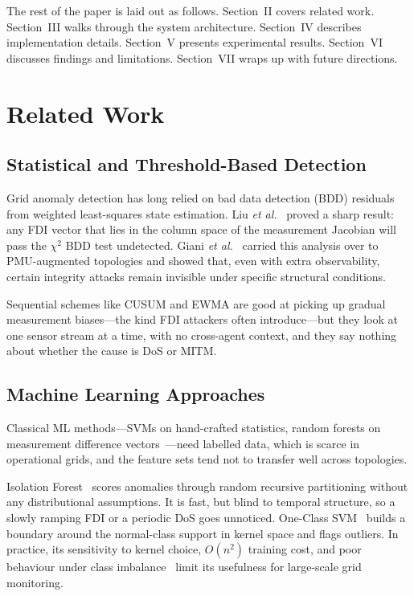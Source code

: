 \documentclass[conference]{IEEEtran}
\begin{document}
The rest of the paper is laid out as follows. Section~II covers related work. Section~III walks through the system architecture. Section~IV describes implementation details. Section~V presents experimental results. Section~VI discusses findings and limitations. Section~VII wraps up with future directions.

\section{Related Work}

\subsection{Statistical and Threshold-Based Detection}

Grid anomaly detection has long relied on bad data detection (BDD) residuals from weighted least-squares state estimation. Liu \textit{et al.}~\cite{b2} proved a sharp result: any FDI vector that lies in the column space of the measurement Jacobian will pass the $\chi^2$ BDD test undetected. Giani \textit{et al.}~\cite{b4} carried this analysis over to PMU-augmented topologies and showed that, even with extra observability, certain integrity attacks remain invisible under specific structural conditions.

Sequential schemes like CUSUM and EWMA are good at picking up gradual measurement biases---the kind FDI attackers often introduce---but they look at one sensor stream at a time, with no cross-agent context, and they say nothing about whether the cause is DoS or MITM.

\subsection{Machine Learning Approaches}

Classical ML methods---SVMs on hand-crafted statistics, random forests on measurement difference vectors~\cite{b6}---need labelled data, which is scarce in operational grids, and the feature sets tend not to transfer well across topologies.

Isolation Forest~\cite{b8} scores anomalies through random recursive partitioning without any distributional assumptions. It is fast, but blind to temporal structure, so a slowly ramping FDI or a periodic DoS goes unnoticed. One-Class SVM~\cite{b9} builds a boundary around the normal-class support in kernel space and flags outliers. In practice, its sensitivity to kernel choice, $O(n^2)$ training cost, and poor behaviour under class imbalance~\cite{b10} limit its usefulness for large-scale grid monitoring.
\end{document}
